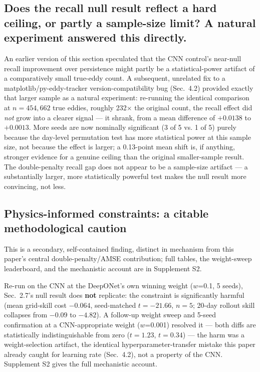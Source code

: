 \documentclass[11pt]{article}
\begin{document}
\subsection{Does the recall null result reflect a hard ceiling, or partly a sample-size limit? A natural experiment answered this directly.}

An earlier version of this section speculated that the CNN control's near-null recall improvement over persistence might partly be a statistical-power artifact of a comparatively small true-eddy count. A subsequent, unrelated fix to a matplotlib/py-eddy-tracker version-compatibility bug (Sec.~4.2) provided exactly that larger sample as a natural experiment: re-running the identical comparison at $n=454{,}662$ true eddies, roughly 232$\times$ the original count, the recall effect did \textit{not} grow into a clearer signal --- it shrank, from a mean difference of $+0.0138$ to $+0.0013$. More seeds are now nominally significant (3 of 5 vs. 1 of 5) purely because the day-level permutation test has more statistical power at this sample size, not because the effect is larger; a 0.13-point mean shift is, if anything, stronger evidence for a genuine ceiling than the original smaller-sample result. The double-penalty recall gap does not appear to be a sample-size artifact --- a substantially larger, more statistically powerful test makes the null result more convincing, not less.

\subsection{Physics-informed constraints: a citable methodological caution}

This is a secondary, self-contained finding, distinct in mechanism from this paper's central double-penalty/AMSE contribution; full tables, the weight-sweep leaderboard, and the mechanistic account are in Supplement S2.

Re-run on the CNN at the DeepONet's own winning weight ($w$=0.1, 5 seeds), Sec.~2.7's null result does \textbf{not} replicate: the constraint is significantly harmful (mean grid-skill cost $-0.064$, seed-matched $t=-21.66$, $n=5$; 20-day rollout skill collapses from $-0.09$ to $-4.82$). A follow-up weight sweep and 5-seed confirmation at a CNN-appropriate weight ($w$=0.001) resolved it --- both diffs are statistically indistinguishable from zero ($t=1.23$, $t=0.34$) --- the harm was a weight-selection artifact, the identical hyperparameter-transfer mistake this paper already caught for learning rate (Sec.~4.2), not a property of the CNN. Supplement S2 gives the full mechanistic account.
\end{document}
